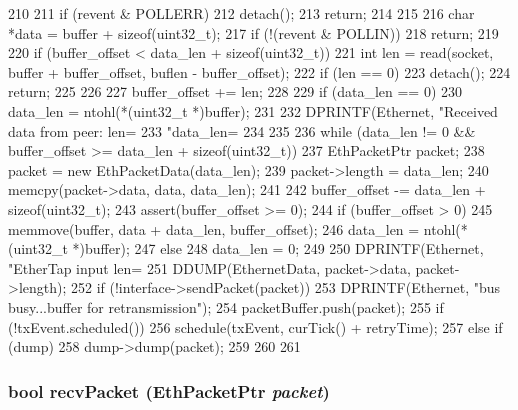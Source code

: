 \begin{DoxyCode}
210 {
211     if (revent & POLLERR) {
212         detach();
213         return;
214     }
215 
216     char *data = buffer + sizeof(uint32_t);
217     if (!(revent & POLLIN))
218         return;
219 
220     if (buffer_offset < data_len + sizeof(uint32_t)) {
221         int len = read(socket, buffer + buffer_offset, buflen - buffer_offset);
222         if (len == 0) {
223             detach();
224             return;
225         }
226 
227         buffer_offset += len;
228 
229         if (data_len == 0)
230             data_len = ntohl(*(uint32_t *)buffer);
231 
232         DPRINTF(Ethernet, "Received data from peer: len=%
233                 "data_len=%
234     }
235 
236     while (data_len != 0 && buffer_offset >= data_len + sizeof(uint32_t)) {
237         EthPacketPtr packet;
238         packet = new EthPacketData(data_len);
239         packet->length = data_len;
240         memcpy(packet->data, data, data_len);
241 
242         buffer_offset -= data_len + sizeof(uint32_t);
243         assert(buffer_offset >= 0);
244         if (buffer_offset > 0) {
245             memmove(buffer, data + data_len, buffer_offset);
246             data_len = ntohl(*(uint32_t *)buffer);
247         } else
248             data_len = 0;
249 
250         DPRINTF(Ethernet, "EtherTap input len=%
251         DDUMP(EthernetData, packet->data, packet->length);
252         if (!interface->sendPacket(packet)) {
253             DPRINTF(Ethernet, "bus busy...buffer for retransmission\n");
254             packetBuffer.push(packet);
255             if (!txEvent.scheduled())
256                 schedule(txEvent, curTick() + retryTime);
257         } else if (dump) {
258             dump->dump(packet);
259         }
260     }
261 }
\end{DoxyCode}
\hypertarget{classEtherTap_ad54e71348f53dfb5444979e9bfaf3164}{
\subsubsection[{recvPacket}]{\setlength{\rightskip}{0pt plus 5cm}bool recvPacket ({\bf EthPacketPtr} {\em packet})}}
\label{classEtherTap_ad54e71348f53dfb5444979e9bfaf3164}



